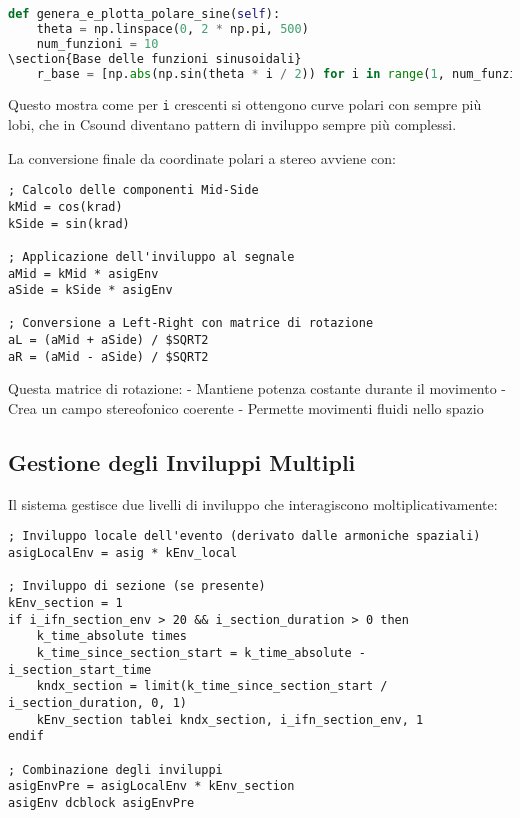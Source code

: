 \begin{lstlisting}[language=Python]
def genera_e_plotta_polare_sine(self):
    theta = np.linspace(0, 2 * np.pi, 500)
    num_funzioni = 10
\section{Base delle funzioni sinusoidali}
    r_base = [np.abs(np.sin(theta * i / 2)) for i in range(1, num_funzioni + 1)]
\end{lstlisting}

Questo mostra come per \texttt{i} crescenti si ottengono curve polari con sempre più lobi, che in Csound diventano pattern di inviluppo sempre più complessi.

La conversione finale da coordinate polari a stereo avviene con:

\begin{lstlisting}[language=Csound]
; Calcolo delle componenti Mid-Side
kMid = cos(krad)
kSide = sin(krad)

; Applicazione dell'inviluppo al segnale
aMid = kMid * asigEnv 
aSide = kSide * asigEnv

; Conversione a Left-Right con matrice di rotazione
aL = (aMid + aSide) / $SQRT2
aR = (aMid - aSide) / $SQRT2
\end{lstlisting}

Questa matrice di rotazione:
- Mantiene potenza costante durante il movimento
- Crea un campo stereofonico coerente
- Permette movimenti fluidi nello spazio
\subsection{Gestione degli Inviluppi Multipli}
Il sistema gestisce due livelli di inviluppo che interagiscono moltiplicativamente:

\begin{lstlisting}[language=Csound]
; Inviluppo locale dell'evento (derivato dalle armoniche spaziali)
asigLocalEnv = asig * kEnv_local

; Inviluppo di sezione (se presente)
kEnv_section = 1
if i_ifn_section_env > 20 && i_section_duration > 0 then
    k_time_absolute times      
    k_time_since_section_start = k_time_absolute - i_section_start_time
    kndx_section = limit(k_time_since_section_start / i_section_duration, 0, 1)
    kEnv_section tablei kndx_section, i_ifn_section_env, 1
endif

; Combinazione degli inviluppi
asigEnvPre = asigLocalEnv * kEnv_section
asigEnv dcblock asigEnvPre
\end{lstlisting}

